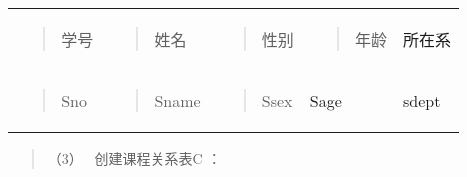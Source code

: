 \documentclass[
]{article}
\begin{document}
\begin{longtable}[]{@{}lllll@{}}
\toprule
\endhead
\begin{minipage}[t]{0.17\columnwidth}\raggedright
\begin{quote}
学号
\end{quote}\strut
\end{minipage} & \begin{minipage}[t]{0.17\columnwidth}\raggedright
\begin{quote}
姓名
\end{quote}\strut
\end{minipage} & \begin{minipage}[t]{0.17\columnwidth}\raggedright
\begin{quote}
性别
\end{quote}\strut
\end{minipage} & \begin{minipage}[t]{0.17\columnwidth}\raggedright
\begin{quote}
年龄
\end{quote}\strut
\end{minipage} & \begin{minipage}[t]{0.17\columnwidth}\raggedright
所在系\strut
\end{minipage}\tabularnewline
\begin{minipage}[t]{0.17\columnwidth}\raggedright
\begin{quote}
Sno
\end{quote}\strut
\end{minipage} & \begin{minipage}[t]{0.17\columnwidth}\raggedright
\begin{quote}
Sname
\end{quote}\strut
\end{minipage} & \begin{minipage}[t]{0.17\columnwidth}\raggedright
\begin{quote}
Ssex
\end{quote}\strut
\end{minipage} & \begin{minipage}[t]{0.17\columnwidth}\raggedright
Sage\strut
\end{minipage} & \begin{minipage}[t]{0.17\columnwidth}\raggedright
sdept\strut
\end{minipage}\tabularnewline
\bottomrule
\end{longtable}

\begin{quote}
（3）~ 创建课程关系表C ：
\end{quote}
\end{document}
